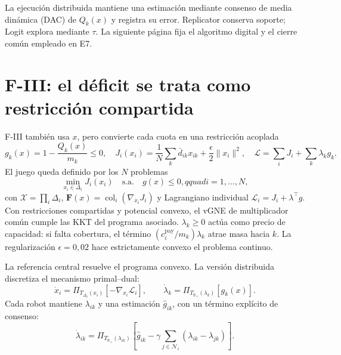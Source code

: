 La ejecución distribuida mantiene una estimación mediante consenso de media
dinámica (DAC) de $Q_k(x)$ y registra su
error. Replicator conserva soporte; Logit explora mediante $\tau$. La siguiente
página fija el algoritmo digital y el cierre común empleado en E7.

\clearpage

\section*{F-III: el déficit se trata como restricción compartida}
\enlargethispage{1\baselineskip}
\begingroup
\setlength{\abovedisplayskip}{5pt}
\setlength{\belowdisplayskip}{5pt}
\setlength{\abovedisplayshortskip}{3pt}
\setlength{\belowdisplayshortskip}{3pt}

F-III también usa $x$, pero convierte cada cuota en una restricción acoplada
\begin{equation}
\label{eq:n4-shared-constraint}
g_k(x)=1-\frac{Q_k(x)}{m_k}\le0,
\quad
J_i(x_i)=\frac1N\sum_k\bar d_{ik}x_{ik}
+\frac{\epsilon}{2}\lVert x_i\rVert^2,
\quad
\mathcal L=\sum_iJ_i+\sum_k\lambda_kg_k.
\end{equation}
El juego queda definido por los $N$ problemas
\begin{equation}
\label{eq:n4-vgne-player-problem}
\min_{x_i\in\Delta_i}J_i(x_i)
\quad\text{s.a.}\quad g(x)\leq0,qquad i=1,\ldots,N,
\end{equation}
con $\mathcal X=\prod_i\Delta_i$,
$\mathbf F(x)=\operatorname{col}_i(\nabla_{x_i}J_i)$ y Lagrangiano individual
$\mathcal L_i=J_i+\lambda^\top g$. Con restricciones compartidas y potencial
convexo, el vGNE de multiplicador común cumple las KKT del programa asociado.
$\lambda_k\ge0$ actúa como precio de capacidad: si falta cobertura, el término
$(c_i^{\mathrm{pay}}/m_k)\lambda_k$ atrae masa hacia $k$. La regularización
$\epsilon=0{,}02$ hace estrictamente convexo el problema continuo.

La referencia central resuelve el programa convexo. La versión distribuida
discretiza el mecanismo primal--dual:
\begin{equation}
\label{eq:n4-primal-dual-candidate}
\dot x_i=\Pi_{T_{\Delta_i}(x_i)}[-\nabla_{x_i}\mathcal L_i],
\qquad
\dot\lambda_k=\Pi_{T_{\mathbb R_+}(\lambda_k)}[g_k(x)].
\end{equation}
Cada robot mantiene $\lambda_{ik}$ y una estimación
$\widehat g_{ik}$, con un término explícito de consenso:
\begin{equation}
\label{eq:n4-distributed-dual-candidate}
\dot\lambda_{ik}=\Pi_{T_{\mathbb R_+}(\lambda_{ik})}
\left[\widehat g_{ik}-\gamma\sum_{j\in\mathcal N_i}
(\lambda_{ik}-\lambda_{jk})\right].
\end{equation}

